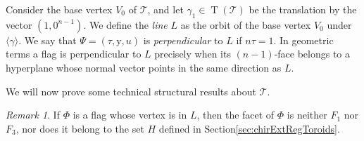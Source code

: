 \documentclass[final]{amsart}
\theoremstyle{plain}
\theoremstyle{definition}
\theoremstyle{remark}
\newtheorem{rem}[thm]{Remark}
\numberwithin{equation}{section}
\renewcommand{\{}{\lbrace}
\renewcommand{\}}{\rbrace}
\newcommand{\cT}{\mathcal{T}}
\newcommand{\cyvec}[1]{{\mathrm{#1}}}
\newcommand{\vy}{\cyvec{y}}
\DeclareMathOperator{\tras}{T}
\begin{document}
Consider the base vertex $V_0$ of $\cT$, and let $\gamma_{1} \in \tras(\cT)$ be the translation by the vector $(1,0^{n-1})$. 
We define the \emph{line} $L$ as the orbit of the base vertex $V_0$ under $\langle \gamma \rangle$. 
We say that $\Psi=  (\tau, \vy, u)$ is \emph{perpendicular} to $L$ if $n \tau = 1$.
In geometric terms a flag is perpendicular to $L$ precisely when its $(n-1)$-face belongs to a hyperplane whose normal vector points in the same direction as $L$.

We will now prove some technical structural results about $\cT$. 


\begin{rem}\label{rem:noBrincos}
If $\Phi$ is a flag whose vertex is in $L$, then the facet of $\Phi$ is neither $F_1$ nor $F_3$, nor does it belong to the set $H$ defined in Section\nobreakspace \ref {sec:chirExtRegToroids}. 
\end{rem}









 
\end{document}
